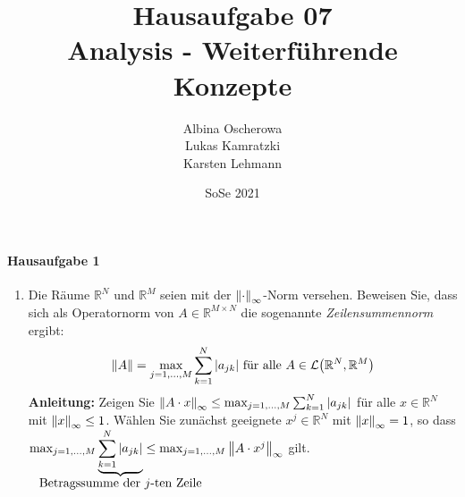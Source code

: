 \documentclass{scrreprt}
\author{Albina Oscherowa \\ Lukas Kamratzki \\ Karsten Lehmann}
\date{SoSe 2021}
\title{Hausaufgabe 07 \\Analysis - Weiterführende Konzepte}
\begin{document}
\paragraph{Hausaufgabe 1}
\begin{enumerate}[1)]
\item Die Räume $\mathbb{R}^N$ und $\mathbb{R}^M$ seien mit der
  $\norm{\cdot}_{\infty}$-Norm versehen.
  Beweisen Sie, dass sich als Operatornorm von $A \in \mathbb{R}^{M \times N}$
  die sogenannte \textit{Zeilensummennorm} ergibt:
  \[
    \norm{A} = \max_{j = 1, \ldots, M} \sum_{k = 1}^N \abs{a_{jk}}
    \text{ für alle } A \in \mathcal{L}\qty(\mathbb{R}^N, \mathbb{R}^M)
  \]
  \textbf{Anleitung:} Zeigen Sie
  $\norm{A \cdot x}_{\infty} \leq \max_{j = 1, \ldots, M} \sum_{k = 1}^N \abs{a_{jk}}$
  für alle $x \in \mathbb{R}^N$ mit $\norm{x}_{\infty} \leq 1$.
  Wählen Sie zunächst geeignete $x^j \in \mathbb{R}^N$ mit
  $\norm{x}_{\infty} = 1$, so dass
  $\max_{j = 1, \ldots, M} \underset{\makebox[0pt]{Betragssumme der $j$-ten Zeile}}{\underbrace{\sum_{k = 1}^N \abs{a_{jk}}}}
  \leq \max_{j = 1, \ldots, M} \norm{A \cdot x^j}_{\infty}$
  gilt.


\end{enumerate}
\end{document}
